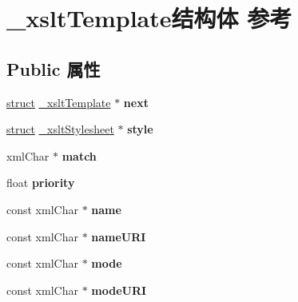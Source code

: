 \hypertarget{struct__xslt_template}{}\section{\+\_\+xslt\+Template结构体 参考}
\label{struct__xslt_template}
\subsection*{Public 属性}
\begin{DoxyCompactItemize}
\item 
\mbox{\label{struct__xslt_template_a2a575a088ca61aef6e26c9985d4290a8}} 
\hyperlink{interfacestruct}{struct} \hyperlink{struct__xslt_template}{\+\_\+xslt\+Template} $\ast$ {\bfseries next}
\item 
\mbox{\label{struct__xslt_template_ad076051cf18892d16eb42c068e63b61c}} 
\hyperlink{interfacestruct}{struct} \hyperlink{struct__xslt_stylesheet}{\+\_\+xslt\+Stylesheet} $\ast$ {\bfseries style}
\item 
\mbox{\label{struct__xslt_template_aedd1047715a8733e7779192c5659cc9c}} 
xml\+Char $\ast$ {\bfseries match}
\item 
\mbox{\label{struct__xslt_template_aaa50923884bef0cb93168a2528078633}} 
float {\bfseries priority}
\item 
\mbox{\label{struct__xslt_template_a7f9b08366c80bbc303c2d1c2b5b11098}} 
const xml\+Char $\ast$ {\bfseries name}
\item 
\mbox{\label{struct__xslt_template_af8685974268ee020207957097e4ef396}} 
const xml\+Char $\ast$ {\bfseries name\+U\+RI}
\item 
\mbox{\label{struct__xslt_template_a8a6d67dd380190c848a83acd7e643867}} 
const xml\+Char $\ast$ {\bfseries mode}
\item 
\mbox{\label{struct__xslt_template_a34a145dd4d7d603e6c6efc01242edd87}} 
const xml\+Char $\ast$ {\bfseries mode\+U\+RI}
\item 
\mbox{\label{struct__xslt_template_a321bb6c38004d7f05ba7f82c01e44373}} 

\end{DoxyCompactItemize}
